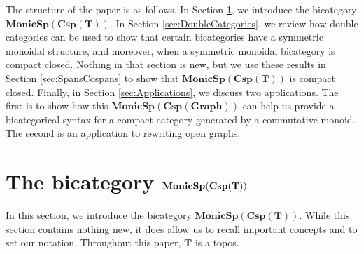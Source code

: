 \documentclass[11pt]{amsart}
\newcommand{\cat}[1]{\mathbf{#1}}
\newcommand{\bimonspcsp}[1]{\mathbf{MonicSp(Csp(#1))}}
\theoremstyle{remark}
\theoremstyle{definition}
\begin{document}
The structure of the paper is as follows.  
In Section 
	\ref{sec:Span cospan bicats}, 
we introduce the bicategory $\bimonspcsp{T}$.  
In Section 
	\ref{sec:DoubleCategories}, 
we review how double categories can be used 
to show that certain bicategories have a symmetric monoidal structure,
and moreover, when a symmetric monoidal bicategory is compact closed.  
Nothing in that section is new, 
but we use these results 
in Section \ref{sec:SpansCospans} 
to show that $\bimonspcsp{T}$ is compact closed.
Finally, in Section 
	\ref{sec:Applications}, 
we discuss two applications.
The first is to show how this
$\bimonspcsp{Graph}$ can help us
provide a bicategorical syntax  
for a compact category generated 
by a commutative monoid.
The second is an application to
rewriting open graphs.



\section{The bicategory $\bold{MonicSp(Csp(T))}$} %
\label{sec:Span cospan bicats}

In this section, we introduce the bicategory $\bimonspcsp{T}$.  
While this section contains nothing new, 
it does allow us to recall important concepts and to set our notation. 
Throughout this paper, 
$\cat{T}$ is a topos.
\end{document}
